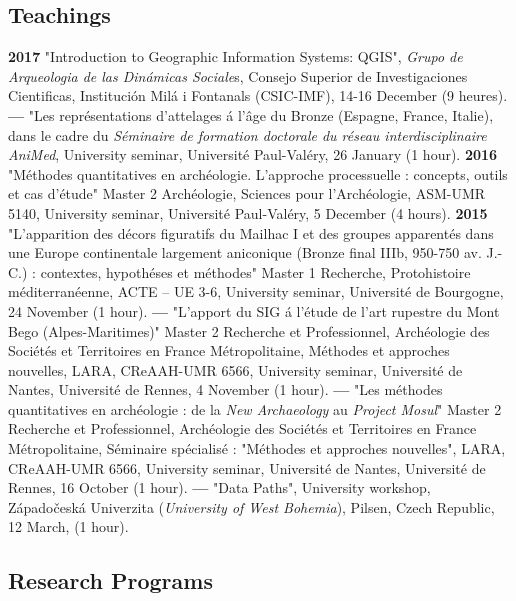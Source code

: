 \documentclass[11pt]{report} %
\begin{document}
\subsection*{Teachings}

\textbf{2017 }"Introduction to Geographic Information Systems: QGIS", \textit{Grupo de Arqueologia de las Din\'{a}micas Sociale}s, Consejo Superior de Investigaciones Cientificas, Instituci\'{o}n Mil\'{a} i Fontanals (CSIC-IMF), 14-16 December (9 heures).\textbf{}
\smallbreak
\textbf{---  }"Les repr\'{e}sentations d'attelages \'{a} l'\^{a}ge du Bronze (Espagne, France, Italie), dans le cadre du \textit{S\'{e}minaire de formation doctorale du r\'{e}seau interdisciplinaire AniMed}, University seminar, Universit\'{e} Paul-Val\'{e}ry, 26 January (1 hour).
\smallbreak
\textbf{2016 }"M\'{e}thodes quantitatives en arch\'{e}ologie. L'approche processuelle : concepts, outils et cas d'\'{e}tude" Master 2 Arch\'{e}ologie, Sciences pour l'Arch\'{e}ologie, ASM-UMR 5140, University seminar, Universit\'{e} Paul-Val\'{e}ry, 5 December (4 hours).
\smallbreak
\textbf{2015 }"L'apparition des d\'{e}cors figuratifs du Mailhac I et des groupes apparent\'{e}s dans une Europe continentale largement aniconique (Bronze final IIIb, 950-750 av. J.-C.) : contextes, hypoth\'{e}ses et m\'{e}thodes" Master 1 Recherche, Protohistoire m\'{e}diterran\'{e}enne, ACTE -- UE 3-6, University seminar, Universit\'{e} de Bourgogne, 24 November (1 hour).
\smallbreak
\textbf{---  }"L'apport du SIG \'{a} l'\'{e}tude de l'art rupestre du Mont Bego (Alpes-Maritimes)" Master 2 Recherche et Professionnel, Arch\'{e}ologie des Soci\'{e}t\'{e}s et Territoires en France M\'{e}tropolitaine, M\'{e}thodes et approches nouvelles, LARA, CReAAH-UMR 6566, University seminar, Universit\'{e} de Nantes, Universit\'{e} de Rennes, 4 November (1 hour).
\smallbreak
\textbf{---  }"Les m\'{e}thodes quantitatives en arch\'{e}ologie : de la \textit{New Archaeology} au \textit{Project Mosul}" Master 2 Recherche et Professionnel, Arch\'{e}ologie des Soci\'{e}t\'{e}s et Territoires en France M\'{e}tropolitaine, S\'{e}minaire sp\'{e}cialis\'{e} : "M\'{e}thodes et approches nouvelles", LARA, CReAAH-UMR 6566, University seminar, Universit\'{e} de Nantes, Universit\'{e} de Rennes, 16 October (1 hour).
\smallbreak
\textbf{---  }"Data Paths", University workshop, Z\'{a}pado\v{c}esk\'{a} Univerzita (\textit{University of West Bohemia}), Pilsen, Czech Republic, 12 March, (1 hour).

\subsection*{Research Programs}
\end{document}
